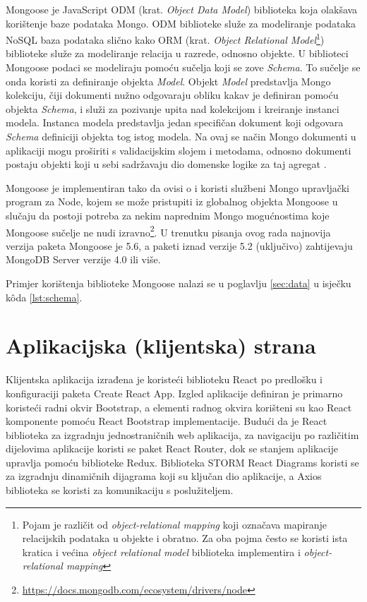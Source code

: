 \documentclass[times, utf8, diplomski, numeric]{fer}
\begin{document}
Mongoose je JavaScript ODM (krat. \emph{Object Data Model}) biblioteka koja olakšava korištenje baze podataka Mongo.
ODM biblioteke služe za modeliranje podataka NoSQL baza podataka slično kako ORM (krat. \emph{Object Relational Model}\footnote{
    Pojam je različit od \emph{object-relational mapping} koji označava mapiranje relacijskih podataka u objekte i obratno. Za oba pojma često se koristi ista kratica i većina \emph{object relational model} biblioteka implementira i \emph{object-relational mapping}
}) biblioteke služe za modeliranje relacija u razrede, odnosno objekte. U biblioteci Mongoose podaci se modeliraju pomoću sučelja koji se zove \emph{Schema}.
To sučelje se onda koristi za definiranje objekta \emph{Model}.
Objekt \emph{Model} predstavlja Mongo kolekciju, čiji dokumenti nužno odgovaraju obliku kakav je definiran pomoću objekta \emph{Schema}, i služi za pozivanje upita nad kolekcijom i kreiranje instanci modela.
Instanca modela predstavlja jedan specifičan dokument koji odgovara \emph{Schema} definiciji objekta tog istog modela.
Na ovaj se način Mongo dokumenti u aplikaciji mogu proširiti s validacijskim slojem i metodama, odnosno dokumenti postaju objekti koji u sebi sadržavaju dio domenske logike za taj agregat \citep{mongoose}.

Mongoose je implementiran tako da ovisi o i koristi službeni Mongo upravljački program  za Node, kojem se može pristupiti iz globalnog objekta Mongoose u slučaju da postoji potreba za nekim naprednim Mongo mogućnostima koje Mongoose sučelje ne nudi izravno\footnote{\url{https://docs.mongodb.com/ecosystem/drivers/node}}.
U trenutku pisanja ovog rada najnovija verzija paketa Mongoose je 5.6, a paketi iznad verzije 5.2 (uključivo) zahtijevaju MongoDB Server verzije 4.0 ili više.

Primjer korištenja biblioteke Mongoose nalazi se u poglavlju \ref{sec:data} u isječku kôda \ref{lst:schema}.


\newpage
\section{Aplikacijska (klijentska) strana}

Klijentska aplikacija izrađena je koristeći biblioteku React po predlošku i konfiguraciji paketa Create React App.
Izgled aplikacije definiran je primarno koristeći radni okvir  Bootstrap, a elementi radnog okvira korišteni su kao React komponente pomoću React Bootstrap implementacije.
Budući da je React biblioteka za izgradnju jednostraničnih  web aplikacija, za navigaciju po različitim dijelovima aplikacije koristi se paket React Router, dok se stanjem aplikacije upravlja pomoću biblioteke Redux.
Biblioteka STORM React Diagrams koristi se za izgradnju dinamičnih dijagrama koji su ključan dio aplikacije, a Axios biblioteka se koristi za komunikaciju s poslužiteljem.
\end{document}
